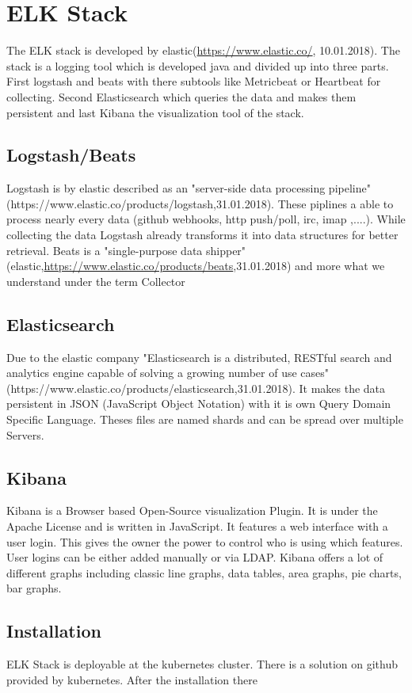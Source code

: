 \section{ELK Stack }
\label{elk} %
The ELK stack is developed by elastic(\url{https://www.elastic.co/}, 10.01.2018). 
The stack is a logging tool which is developed java and divided up into three parts. First  logstash and beats with there subtools like Metricbeat or Heartbeat for collecting. Second Elasticsearch which queries the data and makes them persistent and last Kibana the visualization tool of the stack.
\subsection{Logstash/Beats}
Logstash is by elastic described as an 
"server-side data processing pipeline" (https://www.elastic.co/products/logstash,31.01.2018). These piplines a able to process nearly every data (github webhooks, http push/poll, irc, imap ,....).
While collecting the data Logstash already transforms it into data structures for better retrieval.
Beats is a "single-purpose data shipper" (elastic,\url{https://www.elastic.co/products/beats},31.01.2018) and more what we understand under the term Collector
\subsection{Elasticsearch}
\label{Elasticsearch}
Due to the elastic company "Elasticsearch is a distributed, RESTful search and analytics engine capable of solving a growing number of use cases"\\ (https://www.elastic.co/products/elasticsearch,31.01.2018). It makes the data persistent in JSON (JavaScript Object Notation) with it is own Query Domain Specific Language. Theses files are named shards and can be spread over multiple Servers.
\subsection{Kibana}
Kibana is a Browser based Open-Source visualization Plugin. It is under the Apache License and is written in JavaScript. It features a web interface with a user login. This gives the owner the power to control who is using which features. User logins can be either added manually or via LDAP.
Kibana offers a lot of different graphs including classic line graphs, data tables, area graphs, pie charts, bar graphs.
\subsection{Installation}
ELK Stack is deployable at the kubernetes cluster. There is a solution on github provided by kubernetes. After the installation there 
